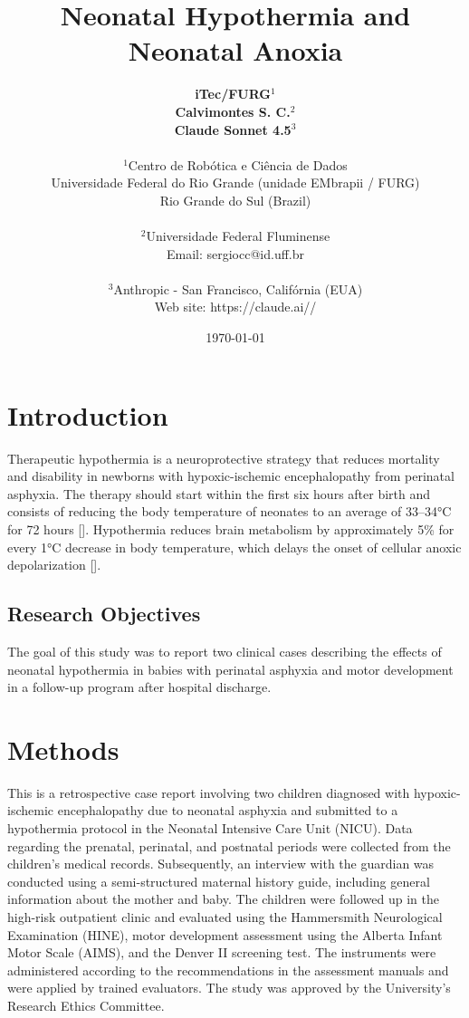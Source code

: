 \documentclass[11pt,a4paper]{article}
\title{\textbf{Neonatal Hypothermia and Neonatal Anoxia}}
\author{
	\textbf{iTec/FURG}$^{1}$ \\
	\textbf{Calvimontes S. C.}$^{2}$ \\
	\textbf{Claude Sonnet 4.5}$^{3}$ \\
	\\
	\small $^{1}$Centro de Robótica e Ciência de Dados \\
	\small Universidade Federal do Rio Grande (unidade EMbrapii / FURG) \\
	\small Rio Grande do Sul (Brazil) \\
	\\
	\small $^{2}$Universidade Federal Fluminense \\
	\small Email: sergiocc@id.uff.br \\
	\\
	\small $^{3}$Anthropic - San Francisco, Califórnia (EUA) \\
	\small Web site: https://claude.ai//
}
\date{\today}
\begin{document}
	
	\maketitle
	
	\newpage
	
	\section{Introduction}
	
	Therapeutic hypothermia is a neuroprotective strategy that reduces mortality and disability in newborns with hypoxic-ischemic encephalopathy from perinatal asphyxia. The therapy should start within the first six hours after birth and consists of reducing the body temperature of neonates to an average of 33–34°C for 72 hours [\cite{Azzopardi2014,Thayyil2021,Abate2021}]. Hypothermia reduces brain metabolism by approximately 5\% for every 1°C decrease in body temperature, which delays the onset of cellular anoxic depolarization [\cite{Silveira2015}].
		
	\subsection{Research Objectives}
	The goal of this study was to report two clinical cases describing the effects of neonatal hypothermia in babies with perinatal asphyxia and motor development in a follow-up program after hospital discharge.
	
	\section{Methods}
	This is a retrospective case report involving two children diagnosed with hypoxic-ischemic encephalopathy due to neonatal asphyxia and submitted to a hypothermia protocol in the Neonatal Intensive Care Unit (NICU). Data regarding the prenatal, perinatal, and postnatal periods were collected from the children's medical records. Subsequently, an interview with the guardian was conducted using a semi-structured maternal history guide, including general information about the mother and baby. The children were followed up in the high-risk outpatient clinic and evaluated using the Hammersmith Neurological Examination (HINE), motor development assessment using the Alberta Infant Motor Scale (AIMS), and the Denver II screening test. The instruments were administered according to the recommendations in the assessment manuals and were applied by trained evaluators. The study was approved by the University's Research Ethics Committee.
	
\end{document}
